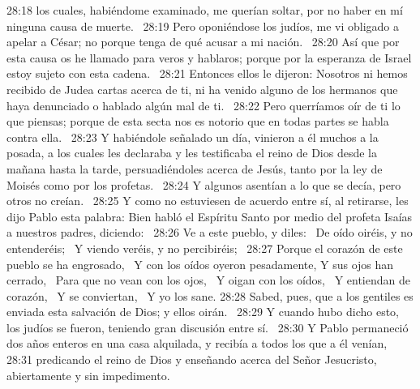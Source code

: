 28:18 los cuales, habiéndome examinado, me querían soltar, por no haber en mí ninguna causa de muerte.  
28:19 Pero oponiéndose los judíos, me vi obligado a apelar a César; no porque tenga de qué acusar a mi nación.  
28:20 Así que por esta causa os he llamado para veros y hablaros; porque por la esperanza de Israel estoy sujeto con esta cadena.  
28:21 Entonces ellos le dijeron: Nosotros ni hemos recibido de Judea cartas acerca de ti, ni ha venido alguno de los hermanos que haya denunciado o hablado algún mal de ti.  
28:22 Pero querríamos oír de ti lo que piensas; porque de esta secta nos es notorio que en todas partes se habla contra ella.  
28:23 Y habiéndole señalado un día, vinieron a él muchos a la posada, a los cuales les declaraba y les testificaba el reino de Dios desde la mañana hasta la tarde, persuadiéndoles acerca de Jesús, tanto por la ley de Moisés como por los profetas.  
28:24 Y algunos asentían a lo que se decía, pero otros no creían.  
28:25 Y como no estuviesen de acuerdo entre sí, al retirarse, les dijo Pablo esta palabra: Bien habló el Espíritu Santo por medio del profeta Isaías a nuestros padres, diciendo:  
28:26 Ve a este pueblo, y diles:  
De oído oiréis, y no entenderéis;  
Y viendo veréis, y no percibiréis;  
28:27 Porque el corazón de este pueblo se ha engrosado,  
Y con los oídos oyeron pesadamente, 
Y sus ojos han cerrado,  
Para que no vean con los ojos,  
Y oigan con los oídos,  
Y entiendan de corazón,  
Y se conviertan,  
Y yo los sane. 
28:28 Sabed, pues, que a los gentiles es enviada esta salvación de Dios; y ellos oirán.  
28:29 Y cuando hubo dicho esto, los judíos se fueron, teniendo gran discusión entre sí.  
28:30 Y Pablo permaneció dos años enteros en una casa alquilada, y recibía a todos los que a él venían,  
28:31 predicando el reino de Dios y enseñando acerca del Señor Jesucristo, abiertamente y sin impedimento. 
